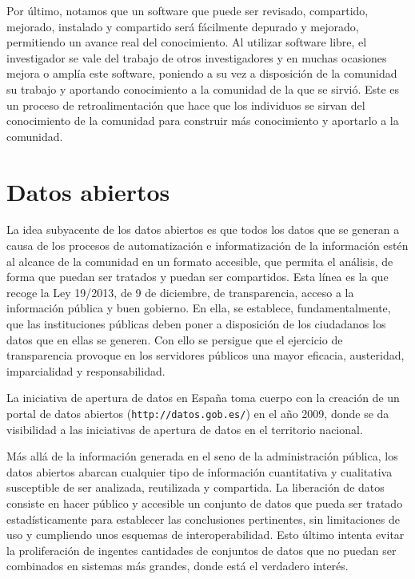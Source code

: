 \documentclass[10pt,twoside,spanish]{article}
\numberwithin{equation}{section}
\begin{document}
Por último, notamos que un software que puede ser revisado, compartido, mejorado, instalado y compartido será fácilmente depurado y mejorado, permitiendo un avance real del conocimiento. Al utilizar software libre, el investigador se vale del trabajo de otros investigadores y en muchas ocasiones mejora o amplía este software,  poniendo a su vez a disposición de la comunidad su trabajo y aportando conocimiento a la comunidad de la que se sirvió. Este es un proceso de retroalimentación que hace que los individuos se sirvan del conocimiento de la comunidad para construir más conocimiento y aportarlo a la comunidad.

\section{Datos abiertos}

La idea subyacente de los datos abiertos es que todos los datos que se generan a causa de los procesos de automatización e informatización de la información estén al alcance de la comunidad en un formato accesible, que permita el análisis, de forma que puedan ser tratados y puedan ser compartidos. Esta línea es la que recoge la Ley 19/2013, de 9 de diciembre, de transparencia, acceso a la información pública y buen gobierno. En ella, se establece, fundamentalmente, que las instituciones públicas deben poner a disposición de los ciudadanos los datos que en ellas se generen. Con ello se persigue que el ejercicio de transparencia provoque en los servidores públicos una mayor eficacia, austeridad, imparcialidad y responsabilidad.

La iniciativa de apertura de datos en España toma cuerpo con la creación de un portal de datos abiertos (\texttt{http://datos.gob.es/}) en el año 2009, donde se da visibilidad a las iniciativas de apertura de datos en el territorio nacional. 

Más allá de la información generada en el seno de la administración pública, los datos abiertos abarcan cualquier tipo de información cuantitativa y cualitativa susceptible de ser analizada, reutilizada y compartida. La liberación de datos consiste en hacer público y accesible un conjunto de datos que pueda ser tratado estadísticamente para establecer las conclusiones pertinentes, sin limitaciones de uso y cumpliendo unos esquemas de interoperabilidad. Esto último intenta evitar la proliferación de ingentes cantidades de conjuntos de datos que no puedan ser combinados en sistemas más grandes, donde está el verdadero interés.
\end{document}
